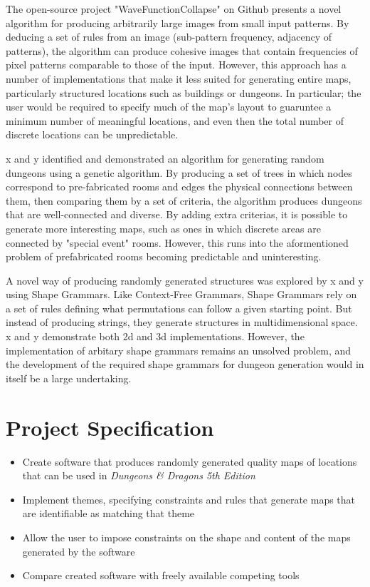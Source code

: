 \documentclass{article}
\begin{document}
The open-source project "WaveFunctionCollapse" on Github presents a novel algorithm for producing arbitrarily large images from small input patterns. By deducing a set of rules from an image (sub-pattern frequency, adjacency of patterns), the algorithm can produce cohesive images that contain frequencies of pixel patterns comparable to those of the input. However, this approach has a number of implementations that make it less suited for generating entire maps, particularly structured locations such as buildings or dungeons. In particular; the user would be required to specify much of the map's layout to guaruntee a minimum number of meaningful locations, and even then the total number of discrete locations can be unpredictable.



x and y identified and demonstrated an algorithm for generating random dungeons using a genetic algorithm. By producing a set of trees in which nodes correspond to pre-fabricated rooms and edges the physical connections between them, then comparing them by a set of criteria, the algorithm produces dungeons that are well-connected and diverse. By adding extra criterias, it is possible to generate more interesting maps, such as ones in which discrete areas are connected by "special event" rooms. However, this runs into the aformentioned problem of prefabricated rooms becoming predictable and uninteresting. 



A novel way of producing randomly generated structures was explored by x and y using Shape Grammars. Like Context-Free Grammars, Shape Grammars rely on a set of rules defining what permutations can follow a given starting point. But instead of producing strings, they generate structures in multidimensional space. x and y demonstrate both 2d and 3d implementations. However, the implementation of arbitary shape grammars remains an unsolved problem, and the development of the required shape grammars for dungeon generation would in itself be a large undertaking.


\pagebreak

\appendix
\section{Project Specification}

\begin{itemize}
    \item Create software that produces randomly generated quality maps of locations that can be used in \textit{Dungeons \& Dragons 5th Edition}
    \item Implement themes, specifying constraints and rules that generate maps that are identifiable as matching that theme
    \item Allow the user to impose constraints on the shape and content of the maps generated by the software
    \item Compare created software with freely available competing tools
\end{itemize}
\end{document}
